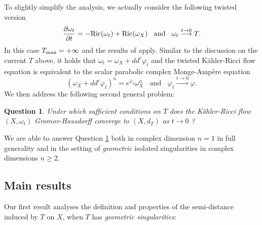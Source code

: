 \documentclass[a4paper,11pt,leqno,english]{smfart}
\theoremstyle{plain}
\theoremstyle{plain}
\newtheorem{ques}{Question}
\numberwithin{equation}{section} %
\numberwithin{figure}{section} %
\theoremstyle{plain}
\theoremstyle{plain}
\theoremstyle{remark}
\theoremstyle{remark}
\theoremstyle{definition}
\theoremstyle{plain}
\theoremstyle{plain}
\theoremstyle{definition}
\newcommand{\f}{\varphi}
\begin{document}
To slightly simplify the analysis, we actually consider the following twisted version 
\begin{equation}\label{eqn-krf-twist-shout}
\frac{\partial \omega_t}{\partial t}=-{\rm Ric}(\omega_t)+{\rm Ric}(\omega_X)
\; \; \text{ and } \; \;
\omega_t \stackrel{t \rightarrow 0}{\longrightarrow} T.
\end{equation}
In this case $T_{\rm max}=+\infty$  and the results 
of \cite{GZ17,DnL17} apply.
Similar to the discussion on the current $T$ above, it holds that $\omega_t=\omega_X+dd^c \f_t$ and
the twisted K\"ahler-Ricci flow equation
is equivalent to the  scalar parabolic complex Monge-Amp\`ere equation
$$
(\omega_X+dd^c \f_t)^n=e^{\dot{\f_t}} \omega_X^n
\; \; \text{ and } \; \;
\f_t \stackrel{t \rightarrow 0}{\longrightarrow} \f.
$$
 We then address the following second general problem:

 \begin{ques}\label{ques-2}
 Under which sufficient conditions on $T$ does the K\"ahler-Ricci flow $(X,\omega_t)$ Gromov-Hausdorff converge to $(X,d_T)$ as $t\rightarrow 0$ ?
 \end{ques}
 
We are able to answer Question \ref{ques-2} both in complex dimension $n=1$ in full generality and in the setting of \textit{geometric} isolated singularities 
in
complex dimensions $n\geq 2$. 
 

 

\subsection{Main results}

Our first result analyses the definition and properties of the semi-distance induced by 
$T$ on $X$,
when $T$ has {\it geometric singularities}:
\end{document}
